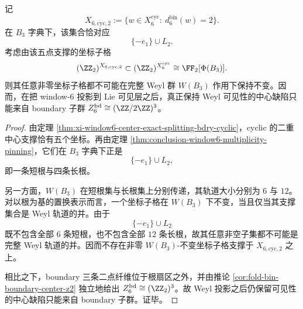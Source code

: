 \begin{proposition}\label{prop:conclusion-window6-cyclic-twofiber-weyl-opacity}
记
\[
X_{6,\mathrm{cyc},2}:=\{w\in X_6^{\mathrm{cyc}}:\ d_6^{\mathrm{bin}}(w)=2\}.
\]
在 \(B_3\) 字典下，该集合恰对应
\[
\{-e_1\}\cup L_2.
\]
考虑由该五点支撑的坐标子格
\[
(\ZZ_2)^{X_{6,\mathrm{cyc},2}}
\subset
(\ZZ_2)^{X_6^{\mathrm{cyc}}}
\cong
\FF_2[\Phi(B_3)].
\]
则其任意非零坐标子格都不可能在完整 Weyl 群 \(W(B_3)\) 作用下保持不变。因而，在把 window-\(6\) 投影到 Lie 可见层之后，真正保持 Weyl 可见性的中心缺陷只能来自 boundary 子群 \(Z_6^{\mathrm{bd}}\cong (\ZZ/2\ZZ)^3\)。
\end{proposition}
\begin{proof}
由定理 \ref{thm:xi-window6-center-exact-splitting-bdry-cyclic}，cyclic 的二重中心支撑恰有五个坐标。再由定理 \ref{thm:conclusion-window6-multiplicity-pinning}，它们在 \(B_3\) 字典下正是
\[
\{-e_1\}\cup L_2,
\]
即一条短根与四条长根。

另一方面，\(W(B_3)\) 在短根集与长根集上分别传递，其轨道大小分别为 \(6\) 与 \(12\)。对以根为基的置换表示而言，一个坐标子格在 \(W(B_3)\) 下不变，当且仅当其支撑集合是 Weyl 轨道的并。由于
\[
\{-e_1\}\cup L_2
\]
既不包含全部 \(6\) 条短根，也不包含全部 \(12\) 条长根，故其任意非空子集都不可能是完整 Weyl 轨道的并。因而不存在非零 \(W(B_3)\)-不变坐标子格支撑于 \(X_{6,\mathrm{cyc},2}\) 之上。

相比之下，boundary 三条二点纤维位于根扇区之外，并由推论 \ref{cor:fold-bin-boundary-center-z2} 独立地给出 \(Z_6^{\mathrm{bd}}\cong(\ZZ_2)^3\)。故 Weyl 投影之后仍保留可见性的中心缺陷只能来自 boundary 子群。证毕。
\end{proof}

